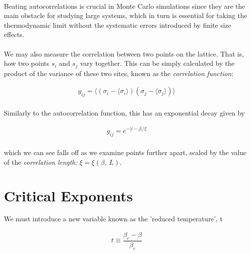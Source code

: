 \documentclass[12pt] {report} %
\begin{document}
			\paragraph{}
				 Beating autocorrelations is crucial in Monte Carlo simulations since they are the main obstacle for studying large systems, which in turn is essential for taking the thermodynamic limit without the systematic errors introduced by finite size effects.
				 
			\paragraph{}
				We may also measure the correlation between two points on the lattice. That is, how two points $s_i$ and $s_j$ vary together. This can be simply calculated by the product of the variance of these two sites, known as the \textit{correlation function}:
				
			\begin{align}
				g_{ij} = \langle (\sigma_i - \langle \sigma_i \rangle)(\sigma_j - \langle \sigma_j \rangle) \rangle \label{eq:correlation_function}
			\end{align}
			
			\paragraph{}
				Similarly to the autocorrelation function, this has an exponential decay given by
				
			\begin{align}
				g_{ij} = e^{-|i-j|/\xi}   \label{eq:correlation_length}
			\end{align}
			
			\paragraph{}
				which we can see falls off as we examine points further apart, scaled by the value of the \textit{correlation length:} $\xi = \xi(\beta,\:L)$.
				 
		
		\section{Critical Exponents}
			
				We must introduce a new variable known as the 'reduced temperature', t
					
				\begin{align}
					t \equiv \dfrac{\beta_c - \beta}{\beta_c}	\label{reduced_temperature}
				\end{align}
				
\end{document}

